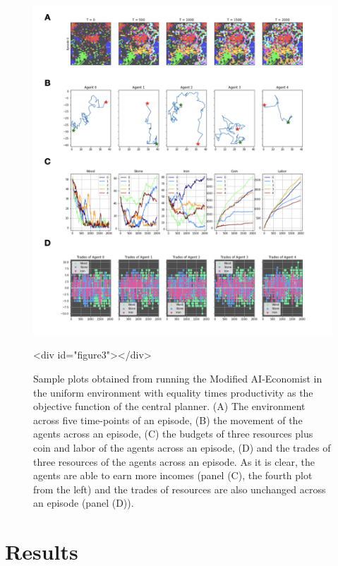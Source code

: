 \documentclass{article}
\begin{document}
\begin{figure}
\centering
\includegraphics[width=0.7\linewidth]{"A_Multi-agent_Reinforcement_Learning_Study_of_Emergence_of_Social_Classes_out_of_Arbitrary_Governance_The_Role_of_Environment_Slides_2/A_Multi-agent_Reinforcement_Learning_Study_of_Emergence_of_Social_Classes_out_of_Arbitrary_Governance_The_Role_of_Environment_Slides_2.002"}
\caption{Sample plots obtained from running the Modified AI-Economist in the uniform environment with equality times productivity as the objective function of the central planner. (A) The environment across five time-points of an episode, (B) the movement of the agents across an episode, (C) the budgets of three resources plus coin and labor of the agents across an episode, (D) and the trades of three resources of the agents across an episode. As it is clear, the agents are able to earn more incomes (panel (C), the fourth plot from the left) and the trades of resources are also unchanged across an episode (panel (D)).}
<div id="figure3"></div>

\end{figure}

\section{Results}
\end{document}

